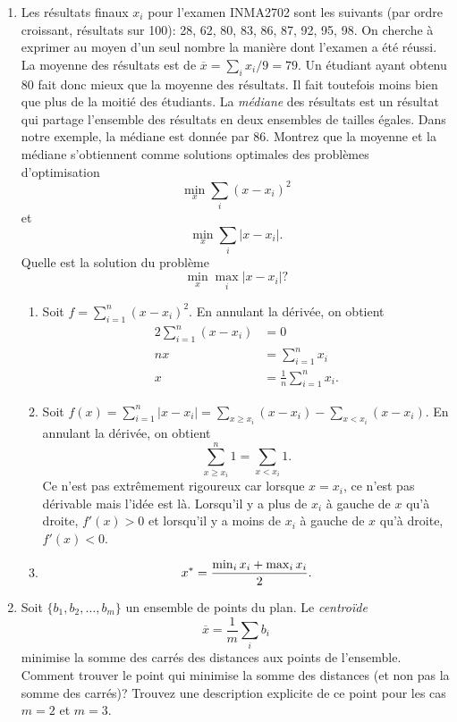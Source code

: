 \begin{enumerate}
  \item Les résultats finaux $x_i$ pour l'examen INMA2702 sont les suivants (par ordre croissant, résultats sur 100): 28, 62, 80,
    83, 86, 87,  92, 95, 98. On cherche à exprimer au moyen d'un seul nombre la manière dont l'examen a été réussi. La moyenne des résultats
    est de
    $\overline x = \sum_i x_i /9 = 79$. Un étudiant ayant
    obtenu 80 fait donc mieux que la moyenne des résultats. Il fait toutefois moins bien que plus de la moitié des étudiants. La
    \emph{médiane}  des résultats est un résultat qui partage l'ensemble des résultats en deux ensembles de  tailles égales. Dans notre
    exemple, la médiane est donnée par $86$. Montrez que la moyenne et la médiane s'obtiennent comme solutions optimales des problèmes
    d'optimisation
    $$\min_x \sum_i (x-x_i)^2$$
    et
    $$\min_x \sum_i |x-x_i|.$$
    Quelle est la solution du problème
    $$\min_x \max_i | x-x_i| ?$$

    \begin{solution}
      \begin{enumerate}
        \item
          Soit $f = \sum_{i=1}^{n}(x-x_{i})^{2}$.
          En annulant la dérivée, on obtient
          \begin{align*}
            2\sum_{i=1}^{n}(x-x_{i}) & = 0\\
            nx & = \sum_{i=1}^{n} x_{i}\\
            x & = \frac{1}{n}\sum_{i=1}^{n} x_{i}.
          \end{align*}
        \item
          Soit $f(x) = \sum_{i=1}^{n} |x-x_{i}| = \sum_{x \geq x_{i}}
          (x-x_{i}) - \sum_{x < x_{i}} (x-x_{i})$.
          En annulant la dérivée, on obtient
          \[ \sum_{x \geq x_i}^n 1 = \sum_{x < x_i} 1. \]
          Ce n'est pas extrêmement rigoureux car lorsque
          $x = x_i$, ce n'est pas dérivable mais l'idée est là.
          Lorsqu'il y a plus de $x_i$ à gauche de $x$ qu'à droite,
          $f'(x) > 0$ et
          lorsqu'il y a moins de $x_i$ à gauche de $x$ qu'à droite,
          $f'(x) < 0$.
        \item
          \[ x^* = \frac{\min_i x_i + \max_i x_i}{2}. \]
      \end{enumerate}
    \end{solution}



  \item  Soit $\{b_1, b_2, \ldots, b_m\}$ un ensemble de points du plan. Le \emph{centro\"ide}
    $$\overline x = \frac{1}{m} \sum_i b_i$$
    minimise la somme des carrés des distances aux points de l'ensemble. Comment trouver le point qui minimise la somme des distances (et
    non pas la somme des carrés)? Trouvez une description explicite de ce point pour les cas $m=2$ et $m=3$.


\end{enumerate}
